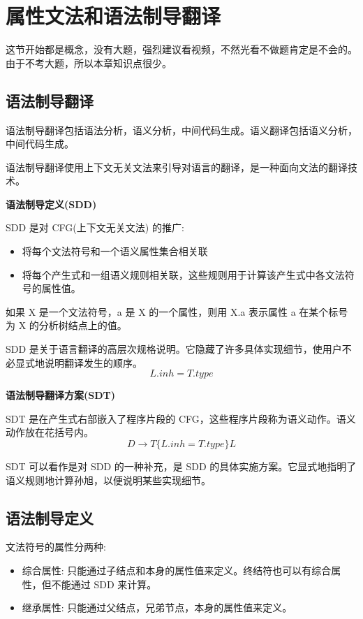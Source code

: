 \section{属性文法和语法制导翻译}

这节开始都是概念，没有大题，强烈建议看视频，不然光看不做题肯定是不会的。由于不考大题，所以本章知识点很少。

\subsection{语法制导翻译}

语法制导翻译包括语法分析，语义分析，中间代码生成。语义翻译包括语义分析，中间代码生成。

语法制导翻译使用上下文无关文法来引导对语言的翻译，是一种面向文法的翻译技术。

\noindent\textbf{语法制导定义(SDD)}

SDD 是对 CFG(上下文无关文法) 的推广:
\begin{itemize}
    \item 将每个文法符号和一个语义属性集合相关联
    \item 将每个产生式和一组语义规则相关联，这些规则用于计算该产生式中各文法符号的属性值。
\end{itemize}

如果 X 是一个文法符号，a 是 X 的一个属性，则用 X.a 表示属性 a 在某个标号为 X 的分析树结点上的值。

SDD 是关于语言翻译的高层次规格说明。它隐藏了许多具体实现细节，使用户不必显式地说明翻译发生的顺序。
\[L.inh = T.type\]

\noindent\textbf{语法制导翻译方案(SDT)}

SDT 是在产生式右部嵌入了程序片段的 CFG，这些程序片段称为语义动作。语义动作放在花括号内。
\[D \rightarrow T\{L.inh = T.type\}L\]

SDT 可以看作是对 SDD 的一种补充，是 SDD 的具体实施方案。它显式地指明了语义规则地计算孙旭，以便说明某些实现细节。

\subsection{语法制导定义}

文法符号的属性分两种:
\begin{itemize}
    \item 综合属性: 只能通过\textcolor{imp}{子结点和本身}的属性值来定义。终结符也可以有综合属性，但不能通过 SDD 来计算。
    \item 继承属性: 只能通过\textcolor{imp}{父结点，兄弟节点，本身}的属性值来定义。
\end{itemize}

